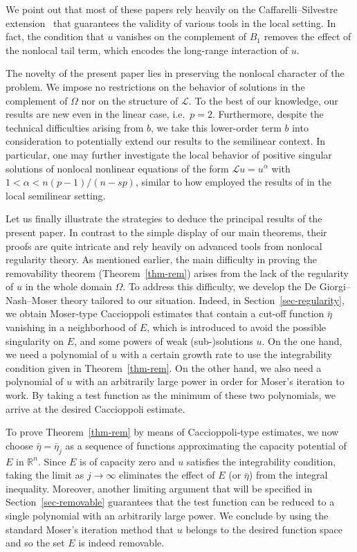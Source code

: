 \documentclass[11pt]{amsart}
\theoremstyle{plain}
\theoremstyle{definition}
\numberwithin{equation}{section}
\begin{document}
    We point out that most of these papers rely heavily on the Caffarelli--Silvestre extension~\cite{CS07} that guarantees the validity of various tools in the local setting. In fact, the condition that $u$ vanishes on the complement of $B_1$ removes the effect of the nonlocal tail term, which encodes the long-range interaction of $u$.


The novelty of the present paper lies in preserving the nonlocal character of the problem. We impose no restrictions on the behavior of solutions in the complement of $\Omega$ nor on the structure of $\mathcal{L}$. To the best of our knowledge, our results are new even in the linear case, i.e.\ $p=2$. Furthermore, despite the technical difficulties arising from $b$, we take this lower-order term $b$ into consideration to potentially extend our results to the semilinear context. In particular, one may further investigate the local behavior of positive singular solutions of nonlocal nonlinear equations of the form $\mathcal{L}u=u^\alpha$ with $1<\alpha < n(p-1)/(n-sp)$, similar to how \cite{BVGHV19, GS81} employed the results of \cite{Ser64, Ser65} in the local semilinear setting. 
	
Let us finally illustrate the strategies to deduce the principal results of the present paper. In contrast to the simple display of our main theorems, their proofs are quite intricate and rely heavily on advanced tools from nonlocal regularity theory. As mentioned earlier, the main difficulty in proving the removability theorem (Theorem~\ref{thm-rem}) arises from the lack of the regularity of $u$ in the whole domain $\Omega$. To address this difficulty, we develop the De Giorgi--Nash--Moser theory tailored to our situation. Indeed, in Section~\ref{sec-regularity}, we obtain Moser-type Caccioppoli estimates that contain a cut-off function $\bar{\eta}$ vanishing in a neighborhood of $E$, which is introduced to avoid the possible singularity on $E$, and some powers of weak (sub-)solutions $u$. On the one hand, we need a polynomial of $u$ with a certain growth rate to use the integrability condition given in Theorem~\ref{thm-rem}. On the other hand, we also need a polynomial of $u$ with an arbitrarily large power in order for Moser's iteration to work. By taking a test function as the minimum of these two polynomials, we arrive at the desired Caccioppoli estimate.


To prove Theorem~\ref{thm-rem} by means of Caccioppoli-type estimates, we now choose $\bar{\eta}=\bar{\eta}_j$ as a sequence of functions approximating the capacity potential of $E$ in $\mathbb{R}^n$. Since $E$ is of capacity zero and $u$ satisfies the integrability condition, taking the limit as $j \to \infty$ eliminates the effect of $E$ (or $\bar{\eta}$) from the integral inequality. Moreover, another limiting argument that will be specified in Section~\ref{sec-removable} guarantees that the test function can be reduced to a single polynomial with an arbitrarily large power. We conclude by using the standard Moser's iteration method that $u$ belongs to the desired function space and so the set $E$ is indeed removable.
 
\end{document}

